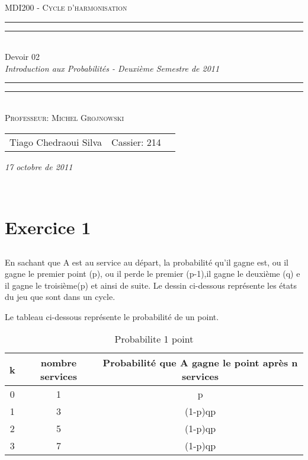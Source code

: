 \documentclass[a4paper]{article}
\date{Octobre 17, 2011}
\newcommand*{\titleTMB}{\begingroup \centering \settowidth{\unitlength}{\LARGE EE531} {\large\scshape MDI200 - Cycle d'harmonisation }\\[0.2\baselineskip] \rule{11.0cm}{1.6pt}\vspace*{-\baselineskip}\vspace*{2pt} \rule{11.0cm}{0.4pt}\\[\baselineskip] {\LARGE Devoir 02}\\\vspace*{\baselineskip}  {\itshape Introduction aux Probabilités - Deuxième Semestre de 2011}\\ \rule{11.0cm}{0.4pt}\vspace*{-\baselineskip}\vspace{3.2pt} \rule{11.0cm}{1.6pt}\\[\baselineskip] {\large\scshape Professeur: Michel Grojnowski}\par \vfill {\normalsize   \scshape 
    \begin{center} 
      \begin{tabular}{  l  l  p{5cm} } 
        Tiago Chedraoui Silva  & Cassier: 214\\
      \end{tabular} \end{center}
    \itshape 17 octobre de 2011    }\\[\baselineskip] \vspace{3.2pt} \endgroup}
\begin{document}
\titleTMB 
\newpage

\section{Exercice 1}
\subsection{}

En sachant que A est au service au départ, la probabilité qu'il gagne est, ou il  gagne le  premier  point (p),  ou il  perde  le premier  (p-1),il gagne  le
deuxième (q) e il gagne le  troisième(p) et ainsi de suite. Le dessin ci-dessous
représente les états du jeu que sont dans un cycle.



Le tableau ci-dessous
représente le probabilité de un point.

\begin{table}[h!]
  \begin{centering}
    \begin{tabular}{|c|c|c|}
      \hline 
      k & nombre services & Probabilité que A gagne le point après n services\tabularnewline
      \hline 
      \hline 
      0 & 1 & p\tabularnewline
      \hline 
      1 & 3 & (1-p)qp\tabularnewline
      \hline 
      2 & 5 & (1-p)\texttwosuperior{}q\texttwosuperior{}p\tabularnewline
      \hline 
      3 & 7 & (1-p)\textthreesuperior{}q\textthreesuperior{}p\tabularnewline
      \hline 
    \end{tabular}
    \par\end{centering}
  \caption{Probabilite 1 point}
\end{table}
\end{document}
